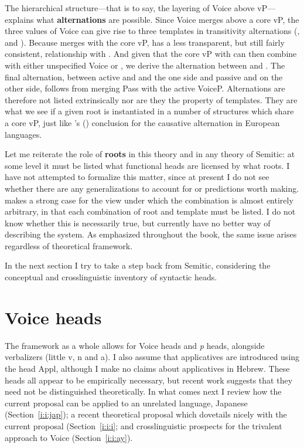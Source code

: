 The hierarchical structure---that is to say, the layering of Voice above vP---explains what \textbf{alternations} are possible. Since Voice merges above a core vP, the three values of Voice can give rise to three templates in transitivity alternations ({\tkal}, {\tnif} and {\thif}). Because {\va} merges with the core vP, {\tpie} has a less transparent, but still fairly consistent, relationship with {\tkal}. And given that the core vP with {\va} can then combine with either unspecified Voice or {\vz}, we derive the alternation between {\tpie} and {\thit}. The final alternation, between active {\tpie} and {\thif} and the one side and passive {\tpua} and {\thuf} on the other side, follows from merging Pass with the active VoiceP. Alternations are therefore not listed extrinsically nor are they the property of templates. They are what we see if a given root is instantiated in a number of structures which share a core vP, just like \citeauthor{schaefer08}'s (\citeyear{schaefer08}) conclusion for the causative alternation in European languages.

Let me reiterate the role of \textbf{roots} in this theory and in any theory of Semitic: at some level it must be listed what functional heads are licensed by what roots. I have not attempted to formalize this matter, since at present I do not see whether there are any generalizations to account for or predictions worth making. \cite{arad05} makes a strong case for the view under which the combination is almost entirely arbitrary, in that each combination of root and template must be listed. I do not know whether this is necessarily true, but currently have no better way of describing the system. As emphasized throughout the book, the same issue arises regardless of theoretical framework.

In the next section I try to take a step back from Semitic, considering the conceptual and crosslinguistic inventory of syntactic heads.


\section{Voice heads} \label{i:i}
The framework as a whole allows for Voice heads and \emph{p} heads, alongside verbalizers (little v, n and a). I also assume that applicatives are introduced using the head Appl, although I make no claims about applicatives in Hebrew. These heads all appear to be empirically necessary, but recent work suggests that they need not be distinguished theoretically. In what comes next I review how the current proposal can be applied to an unrelated language, Japanese (Section~\ref{i:i:jap}); a recent theoretical proposal which dovetails nicely with the current proposal (Section~\ref{i:i:i}; and crosslinguistic prospects for the trivalent approach to Voice (Section~\ref{i:i:ay}).

